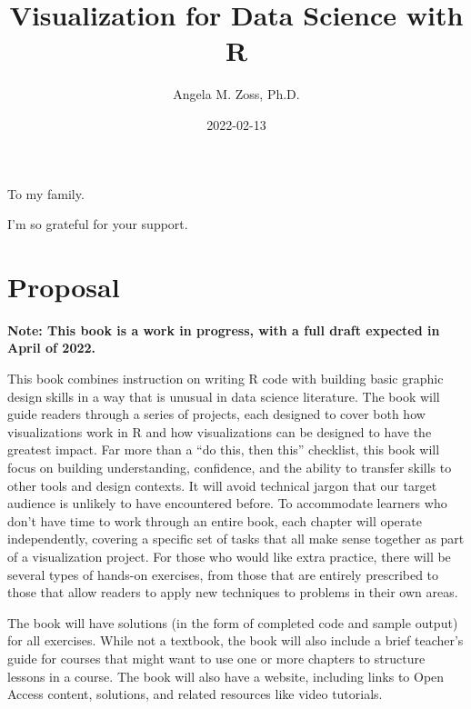 \documentclass[
]{krantz}
\title{Visualization for Data Science with R}
\author{Angela M. Zoss, Ph.D.}
\date{2022-02-13}
\begin{document}
\maketitle


\thispagestyle{empty}

\begin{center}
To my family.

I'm so grateful for your support.
\end{center}

\setlength{\abovedisplayskip}{-5pt}
\setlength{\abovedisplayshortskip}{-5pt}

{
\hypersetup{linkcolor=}
\setcounter{tocdepth}{2}
\tableofcontents
}
\listoftables
\listoffigures
\hypertarget{proposal}{%
\chapter*{Proposal}\label{proposal}}


\textbf{Note: This book is a work in progress, with a full draft expected in April of 2022.}

This book combines instruction on writing R code with building basic graphic design skills in a way that is unusual in data science literature. The book will guide readers through a series of projects, each designed to cover both how visualizations work in R and how visualizations can be designed to have the greatest impact. Far more than a ``do this, then this'' checklist, this book will focus on building understanding, confidence, and the ability to transfer skills to other tools and design contexts. It will avoid technical jargon that our target audience is unlikely to have encountered before. To accommodate learners who don't have time to work through an entire book, each chapter will operate independently, covering a specific set of tasks that all make sense together as part of a visualization project. For those who would like extra practice, there will be several types of hands-on exercises, from those that are entirely prescribed to those that allow readers to apply new techniques to problems in their own areas.

The book will have solutions (in the form of completed code and sample output) for all exercises. While not a textbook, the book will also include a brief teacher's guide for courses that might want to use one or more chapters to structure lessons in a course. The book will also have a website, including links to Open Access content, solutions, and related resources like video tutorials.
\end{document}
